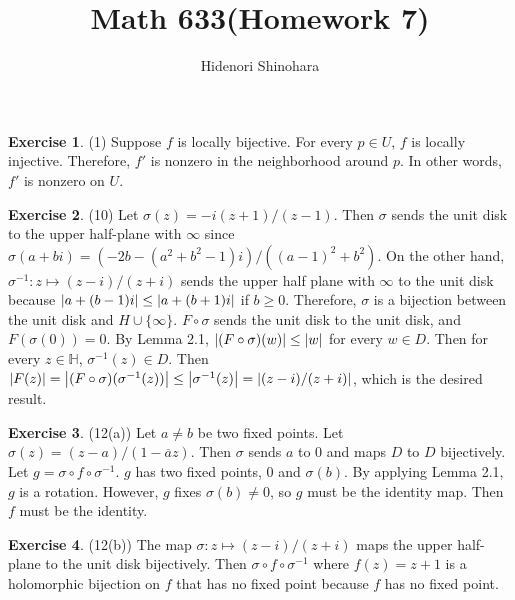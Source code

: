 \documentclass[12pt, psamsfonts]{amsart}
\theoremstyle{definition}
\newtheorem*{exer}{Exercise}
\theoremstyle{remark}
\numberwithin{equation}{section}
\begin{document}
\title{Math 633(Homework 7)}
\author{Hidenori Shinohara}
\maketitle

\begin{exer}{(1)}
  Suppose $f$ is locally bijective.
  For every $p \in U$, $f$ is locally injective.
  Therefore, $f'$ is nonzero in the neighborhood around $p$.
  In other words, $f'$ is nonzero on $U$.

\end{exer}

\begin{exer}{(10)}
  Let $\sigma(z) = -i(z + 1) / (z - 1)$.
  Then $\sigma$ sends the unit disk to the upper half-plane with $\infty$ since
  $\sigma(a + bi) = (-2b - (a^2 + b^2 - 1)i) / ((a - 1)^2 + b^2)$.
  On the other hand, $\sigma^{-1}: z \mapsto (z - i) / (z + i)$ sends the upper half plane with $\infty$ to the unit disk because $\abs{a + (b - 1)i} \leq \abs{a + (b + 1)i}$ if $b \geq 0$.
  Therefore, $\sigma$ is a bijection between the unit disk and $H \cup \{ \infty \}$.
  $F \circ \sigma$ sends the unit disk to the unit disk, and $F(\sigma(0)) = 0$.
  By Lemma 2.1, $\abs{(F \circ \sigma)(w)} \leq \abs{w}$ for every $w \in D$.
  Then for every $z \in \mathbb{H}$, $\sigma^{-1}(z) \in D$.
  Then $\abs{F(z)} = \abs{(F \circ \sigma)(\sigma^{-1}(z))} \leq \abs{\sigma^{-1}(z)} = \abs{(z - i) / (z + i)}$, which is the desired result.
\end{exer}

\begin{exer}{(12(a))}
  Let $a \ne b$ be two fixed points.
  Let $\sigma(z) = (z - a) / (1 - \overline{a}z)$.
  Then $\sigma$ sends $a$ to $0$ and maps $D$ to $D$ bijectively.
  Let $g = \sigma \circ f \circ \sigma^{-1}$.
  $g$ has two fixed points, 0 and $\sigma(b)$.
  By applying Lemma 2.1, $g$ is a rotation.
  However, $g$ fixes $\sigma(b) \ne 0$, so $g$ must be the identity map.
  Then $f$ must be the identity.
\end{exer}

\begin{exer}{(12(b))}
  The map $\sigma: z \mapsto (z - i) / (z + i)$ maps the upper half-plane to the unit disk bijectively.
  Then $\sigma \circ f \circ \sigma^{-1}$ where $f(z) = z + 1$ is a holomorphic bijection on $f$ that has no fixed point because $f$ has no fixed point.
\end{exer}
\end{document}
